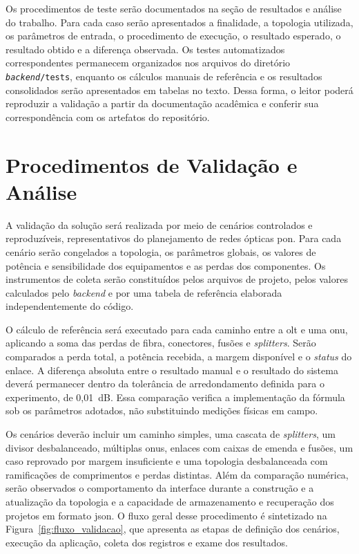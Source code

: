Os procedimentos de teste serão documentados na seção de resultados e análise do trabalho. Para cada caso serão apresentados a finalidade, a topologia utilizada, os parâmetros de entrada, o procedimento de execução, o resultado esperado, o resultado obtido e a diferença observada. Os testes automatizados correspondentes permanecem organizados nos arquivos do diretório \texttt{\textit{backend}/tests}, enquanto os cálculos manuais de referência e os resultados consolidados serão apresentados em tabelas no texto. Dessa forma, o leitor poderá reproduzir a validação a partir da documentação acadêmica e conferir sua correspondência com os artefatos do repositório.

\section{Procedimentos de Validação e Análise}

A validação da solução será realizada por meio de cenários controlados e reproduzíveis, representativos do planejamento de redes ópticas \gls{pon}. Para cada cenário serão congelados a topologia, os parâmetros globais, os valores de potência e sensibilidade dos equipamentos e as perdas dos componentes. Os instrumentos de coleta serão constituídos pelos arquivos de projeto, pelos valores calculados pelo \textit{backend} e por uma tabela de referência elaborada independentemente do código.

O cálculo de referência será executado para cada caminho entre a \gls{olt} e uma \gls{onu}, aplicando a soma das perdas de fibra, conectores, fusões e \textit{splitters}. Serão comparados a perda total, a potência recebida, a margem disponível e o \textit{status} do enlace. A diferença absoluta entre o resultado manual e o resultado do sistema deverá permanecer dentro da tolerância de arredondamento definida para o experimento, de 0,01~dB. Essa comparação verifica a implementação da fórmula sob os parâmetros adotados, não substituindo medições físicas em campo.

Os cenários deverão incluir um caminho simples, uma cascata de \textit{splitters}, um divisor desbalanceado, múltiplas \glspl{onu}, enlaces com caixas de emenda e fusões, um caso reprovado por margem insuficiente e uma topologia desbalanceada com ramificações de comprimentos e perdas distintas. Além da comparação numérica, serão observados o comportamento da interface durante a construção e a atualização da topologia e a capacidade de armazenamento e recuperação dos projetos em formato \gls{json}. O fluxo geral desse procedimento é sintetizado na Figura~\ref{fig:fluxo_validacao}, que apresenta as etapas de definição dos cenários, execução da aplicação, coleta dos registros e exame dos resultados.

